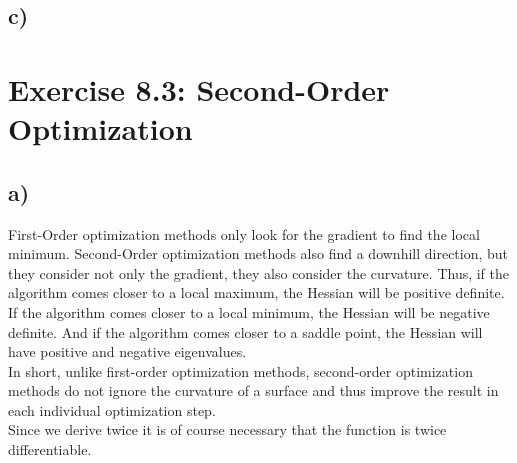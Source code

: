 \documentclass[a4paper]{article}
\begin{document}
    \subsection*{c)}
        



\newpage
\section*{Exercise 8.3: Second-Order Optimization}
    \subsection*{a)}
        First-Order optimization methods only look for the gradient to find the local minimum.
        Second-Order optimization methods also find a downhill direction, but they consider not only the gradient, they also consider the curvature.
        Thus, if the algorithm comes closer to a local maximum, the Hessian will be positive definite.
        If the algorithm comes closer to a local minimum, the Hessian will be negative definite.
        And if the algorithm comes closer to a saddle point, the Hessian will have positive and negative eigenvalues.\\
        In short, unlike first-order optimization methods, second-order optimization methods do not ignore the curvature of a surface and thus improve the result in each individual optimization step.\\
        
        Since we derive twice it is of course necessary that the function is twice differentiable.
        
\end{document}
